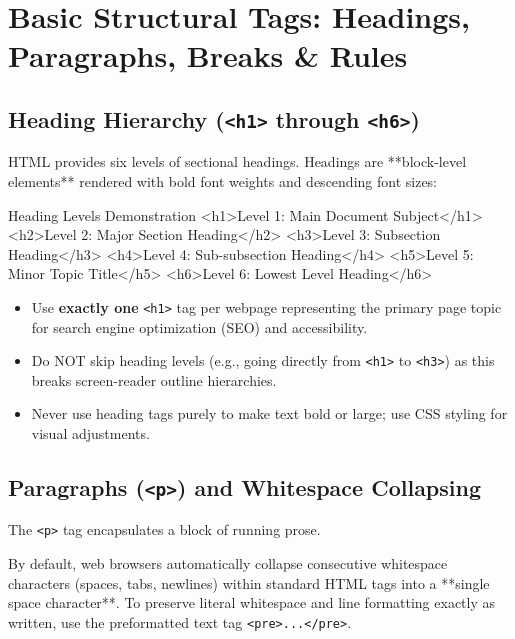 \section{Basic Structural Tags: Headings, Paragraphs, Breaks \& Rules}

\subsection{Heading Hierarchy (\texttt{<h1>} through \texttt{<h6>})}
HTML provides six levels of sectional headings. Headings are **block-level elements** rendered with bold font weights and descending font sizes:

\begin{htmlcode}{Heading Levels Demonstration}
<h1>Level 1: Main Document Subject</h1>
<h2>Level 2: Major Section Heading</h2>
<h3>Level 3: Subsection Heading</h3>
<h4>Level 4: Sub-subsection Heading</h4>
<h5>Level 5: Minor Topic Title</h5>
<h6>Level 6: Lowest Level Heading</h6>
\end{htmlcode}

\begin{examtip}
\begin{itemize}[leftmargin=1.5em]
    \item Use \textbf{exactly one} \texttt{<h1>} tag per webpage representing the primary page topic for search engine optimization (SEO) and accessibility.
    \item Do NOT skip heading levels (e.g., going directly from \texttt{<h1>} to \texttt{<h3>}) as this breaks screen-reader outline hierarchies.
    \item Never use heading tags purely to make text bold or large; use CSS styling for visual adjustments.
\end{itemize}
\end{examtip}

\subsection{Paragraphs (\texttt{<p>}) and Whitespace Collapsing}
The \texttt{<p>} tag encapsulates a block of running prose. 
\begin{conceptbox}
By default, web browsers automatically collapse consecutive whitespace characters (spaces, tabs, newlines) within standard HTML tags into a **single space character**. To preserve literal whitespace and line formatting exactly as written, use the preformatted text tag \texttt{<pre>...</pre>}.
\end{conceptbox}

